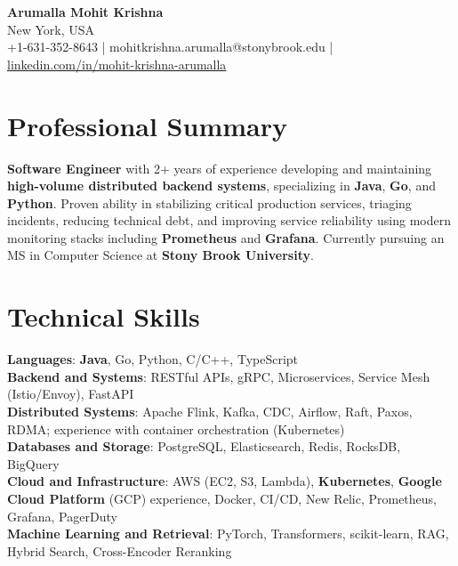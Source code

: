 \documentclass[letterpaper,11pt]{article}
\begin{document}
\begin{center}
  {\Large \textbf{Arumalla Mohit Krishna}} \\
  New York, USA \\
  +1-631-352-8643 \enspace | \enspace mohitkrishna.arumalla@stonybrook.edu \enspace | \enspace \href{https://www.linkedin.com/in/mohit-krishna-arumalla}{linkedin.com/in/mohit-krishna-arumalla}
\end{center}

\section{Professional Summary}
  \begin{itemize}[leftmargin=0.15in, label={}]
    \small{\item{
     \textbf{Software Engineer} with 2+ years of experience developing and maintaining \textbf{high-volume distributed backend systems}, specializing in \textbf{Java}, \textbf{Go}, and \textbf{Python}. Proven ability in stabilizing critical production services, triaging incidents, reducing technical debt, and improving service reliability using modern monitoring stacks including \textbf{Prometheus} and \textbf{Grafana}. Currently pursuing an MS in Computer Science at \textbf{Stony Brook University}.
    }}
  \end{itemize}
\vspace{-16pt}

\section{Technical Skills}
 \begin{itemize}[leftmargin=0.15in, label={}]
    \small{\item{
     \textbf{Languages}: \textbf{Java}, Go, Python, C/C++, TypeScript \\
     \textbf{Backend and Systems}: RESTful APIs, gRPC, Microservices, Service Mesh (Istio/Envoy), FastAPI \\
     \textbf{Distributed Systems}: Apache Flink, Kafka, CDC, Airflow, Raft, Paxos, RDMA; experience with container orchestration (Kubernetes) \\
     \textbf{Databases and Storage}: PostgreSQL, Elasticsearch, Redis, RocksDB, BigQuery \\
     \textbf{Cloud and Infrastructure}: AWS (EC2, S3, Lambda), \textbf{Kubernetes}, \textbf{Google Cloud Platform} (GCP) experience, Docker, CI/CD, New Relic, Prometheus, Grafana, PagerDuty \\
     \textbf{Machine Learning and Retrieval}: PyTorch, Transformers, scikit-learn, RAG, Hybrid Search, Cross-Encoder Reranking
    }}
 \end{itemize}
\vspace{-16pt}
\end{document}
